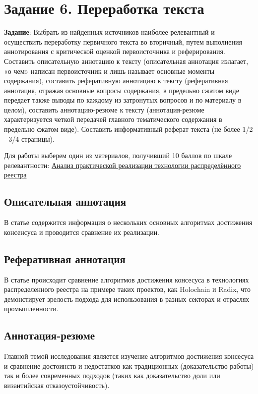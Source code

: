 \documentclass[a4paper, 12pt]{report}		%
\begin{document}
\chapter*{Задание 6. Переработка текста}

\textbf{Задание}: Выбрать из найденных источников наиболее релевантный и осуществить переработку первичного текста во вторичный, путем выполнения аннотирования с критической оценкой первоисточника и реферирования. Составить описательную аннотацию к тексту (описательная аннотация излагает, «о чем» написан первоисточник и лишь называет основные моменты содержания), составить реферативную аннотацию к тексту (реферативная аннотация, отражая основные вопросы содержания, в предельно сжатом виде передает также выводы по каждому из затронутых вопросов и по материалу в целом), составить аннотацию-резюме к тексту (аннотация-резюме характеризуется четкой передачей главного тематического содержания в предельно сжатом виде). Составить информативный реферат текста (не более 1/2 - 3/4 страницы).

Для работы выберем один из материалов, получивший 10 баллов по шкале релевантности: \href{https://elibrary.ru/item.asp?id=44065996}{Анализ практической реализации технологии распределённого реестра}

\section*{Описательная аннотация}
В статье содержится информация о нескольких основных алгоритмах достижения консенсуса и проводится сравнение их реализации.

\section*{Реферативная аннотация}
В статье происходит сравнение алгоритмов достижения консесуса в технологиях распределенного реестра на примере таких проектов, как Holochain и Radix, что демонстирует зрелость подхода для использования в разных секторах и отраслях промышленности.

\section*{Аннотация-резюме}
Главной темой исследования является изучение алгоритмов достижения консесуса и сравнение достоинств и недостатков как традиционных (доказательство работы) так и более современных подходов (таких как доказательство доли или византийская отказоустойчивость).
\end{document}
